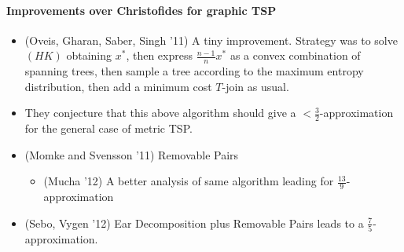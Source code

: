 \documentclass[letterpaper,12pt,oneside,onecolumn]{article}
\begin{document}
\paragraph{Improvements over Christofides for graphic TSP}
\begin{itemize}
\item(Oveis, Gharan,  Saber, Singh '11) A tiny improvement. Strategy was to solve $(HK)$ obtaining $x^*$, then express $\frac{n-1}{n}x^*$ as a convex combination of spanning trees, then sample a tree according to the maximum entropy distribution, then add a minimum cost $T$-join as usual.
\item They conjecture that this above algorithm should give a $<\frac{3}{2}$-approximation for the general case of metric TSP.
\item (Momke and Svensson '11) Removable Pairs
\begin{itemize}
\item (Mucha '12) A better analysis of same algorithm leading for $\frac{13}{9}$-approximation 
\end{itemize}
\item (Sebo, Vygen '12) Ear Decomposition plus Removable Pairs leads to a $\frac{7}{5}$-approximation.
\end{itemize}
\end{document}
